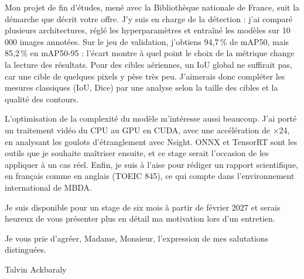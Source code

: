 \documentclass[11pt, a4paper]{extarticle}
\begin{document}
Mon projet de fin d'études, mené avec la Bibliothèque nationale de France, suit la démarche que
décrit votre offre. J'y suis en charge de la détection : j'ai comparé plusieurs architectures,
réglé les hyperparamètres et entraîné les modèles sur 10\,000 images annotées. Sur le jeu de
validation, j'obtiens 94,7\,\% de mAP50, mais 85,2\,\% en mAP50-95 : l'écart montre à quel
point le choix de la métrique change la lecture des résultats. Pour des cibles aériennes, un IoU
global ne suffirait pas, car une cible de quelques pixels y pèse très peu. J'aimerais donc
compléter les mesures classiques (IoU, Dice) par une analyse selon la taille des cibles et
la qualité des contours.

L'optimisation de la complexité du modèle m'intéresse aussi beaucoup. J'ai porté un traitement
vidéo du CPU au GPU en CUDA, avec une accélération de ×24, en analysant les goulots
d'étranglement avec Nsight. ONNX et TensorRT sont les outils que je souhaite maîtriser ensuite,
et ce stage serait l'occasion de les appliquer à un cas réel. Enfin, je suis à l'aise pour
rédiger un rapport scientifique, en français comme en anglais (TOEIC 845), ce qui compte dans
l'environnement international de MBDA.

Je suis disponible pour un stage de six mois à partir de février 2027 et serais heureux de vous
présenter plus en détail ma motivation lors d'un entretien.

Je vous prie d'agréer, Madame, Monsieur, l'expression de mes salutations distinguées.

\vspace{10pt}
\hfill Talvin Ackbaraly\hspace*{1cm}
\end{document}
